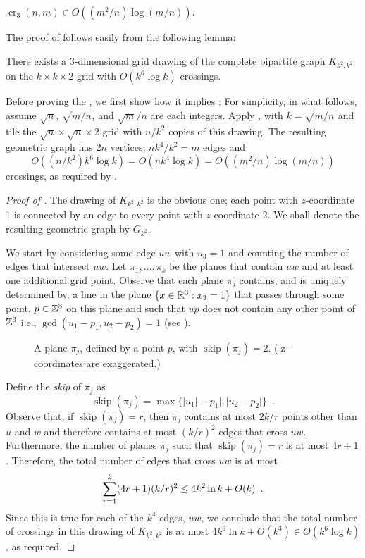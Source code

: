 \documentclass{patmorin}
\DeclareMathOperator{\z}{z}
\DeclareMathOperator{\crs}{cr}
\DeclareMathOperator{\skp}{skip}
\begin{document}
\begin{thm}
  $\crs_3(n,m) \in O((m^2/n)\log (m/n))$.
\end{thm}

The proof of  follows easily from the following lemma:
\begin{lem}
  There exists a 3-dimensional grid drawing of the complete bipartite
  graph $K_{k^2,k^2}$ on the $k\times k\times 2$ grid with $O(k^6\log
  k)$ crossings.
\end{lem}

Before proving the , we first show how it implies
: For simplicity, in what follows, assume $\sqrt{n}$,
$\sqrt{m/n}$, and $\sqrt{m}/n$ are each integers.  Apply ,
with $k=\sqrt{m/n}$ and tile the $\sqrt{n}\times\sqrt{n}\times 2$ grid
with $n/k^2$ copies of this drawing. The resulting geometric graph has
$2n$ vertices, $nk^4/k^2=m$ edges and
\[ O((n/k^2)k^6\log k) = O(nk^4\log k) = O((m^2/n)\log(m/n))
\] 
crossings, as required by .

\begin{proof}[Proof of ]
The drawing of $K_{k^2,k^2}$ is the obvious one; each point with
$z$-coordinate 1 is connected by an edge to every point with
$z$-coordinate 2.  We shall denote the resulting geometric graph
by $G_{k^2}$.

We start by considering some edge $uw$ with $u_3=1$ and counting the
number of edges that intersect $uw$.  Let $\pi_1,\ldots,\pi_k$ be
the planes that contain $uw$ and at least one additional grid point.
Observe that each plane $\pi_j$ contains, and is uniquely determined by,
a line in the plane $\{x\in\mathbb{R}^3: x_3=1\}$ that passes through some point,
$p\in\mathbb{Z}^3$ on this plane and such that $up$ does not contain any other
point of $\mathbb{Z}^3$ i.e., $\gcd(u_1-p_1,u_2-p_2)=1$ (see ).
\begin{figure}
  \caption{A plane $\pi_j$, defined by a point $p$, with $\skp(\pi_j)=2$. ($\z$-coordinates are exaggerated.)}
\end{figure}
Define the \emph{skip} of $\pi_j$ as
\[
   \skp(\pi_j)=\max\{|u_1|-p_1|,|u_2-p_2|\} \enspace .
\]
Observe that, if $\skp(\pi_j)=r$, then $\pi_j$ contains at most $2k/r$
points other than $u$ and $w$ and therefore contains at most $(k/r)^2$
edges that cross $uw$.  Furthermore, the number of planes $\pi_j$ such
that $\skp(\pi_j)=r$ is at most $4r+1$.  Therefore, the total number
of edges that cross $uw$ is at most
\begin{equation}
   \sum_{r=1}^k (4r+1)(k/r)^2 \le 4k^2\ln k + O(k) \enspace . \eqlabel{critical}
\end{equation}
Since this is true for each of the $k^4$ edges, $uw$, we conclude that
the total number of crossings in this drawing of $K_{k^2,k^2}$ is at
most $4k^6\ln k+O(k^3)\in O(k^6\log k)$, as required.
\end{proof}
\end{document}
